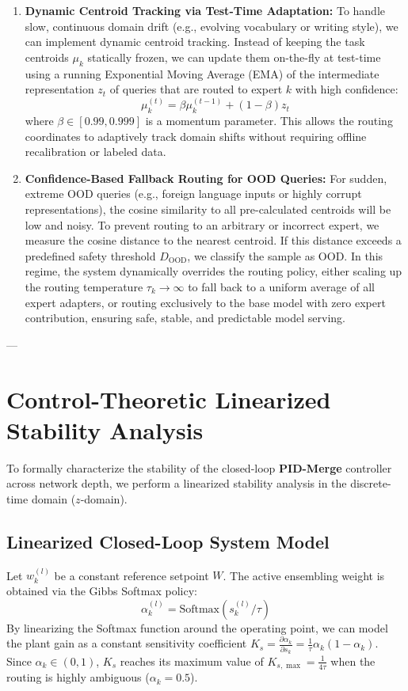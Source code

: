 \begin{enumerate}
    \item \textbf{Dynamic Centroid Tracking via Test-Time Adaptation:} To handle slow, continuous domain drift (e.g., evolving vocabulary or writing style), we can implement dynamic centroid tracking. Instead of keeping the task centroids $\mu_k$ statically frozen, we can update them on-the-fly at test-time using a running Exponential Moving Average (EMA) of the intermediate representation $z_t$ of queries that are routed to expert $k$ with high confidence:
    \begin{equation}
    \mu_k^{(t)} = \beta \mu_k^{(t-1)} + (1 - \beta) z_t
    \end{equation}
    where $\beta \in [0.99, 0.999]$ is a momentum parameter. This allows the routing coordinates to adaptively track domain shifts without requiring offline recalibration or labeled data.
    \item \textbf{Confidence-Based Fallback Routing for OOD Queries:} For sudden, extreme OOD queries (e.g., foreign language inputs or highly corrupt representations), the cosine similarity to all pre-calculated centroids will be low and noisy. To prevent routing to an arbitrary or incorrect expert, we measure the cosine distance to the nearest centroid. If this distance exceeds a predefined safety threshold $D_{\text{OOD}}$, we classify the sample as OOD. In this regime, the system dynamically overrides the routing policy, either scaling up the routing temperature $\tau_k \to \infty$ to fall back to a uniform average of all expert adapters, or routing exclusively to the base model with zero expert contribution, ensuring safe, stable, and predictable model serving.
\end{enumerate}

---

\section{Control-Theoretic Linearized Stability Analysis}
\label{sec:appendix_stability}

To formally characterize the stability of the closed-loop \textbf{PID-Merge} controller across network depth, we perform a linearized stability analysis in the discrete-time domain ($z$-domain).

\subsection{Linearized Closed-Loop System Model}
Let $w_k^{(l)}$ be a constant reference setpoint $W$. The active ensembling weight is obtained via the Gibbs Softmax policy:
\begin{equation}
\alpha_k^{(l)} = \text{Softmax}(s_k^{(l)} / \tau)
\end{equation}
By linearizing the Softmax function around the operating point, we can model the plant gain as a constant sensitivity coefficient $K_s = \frac{\partial \alpha_k}{\partial s_k} = \frac{1}{\tau} \alpha_k (1 - \alpha_k)$. Since $\alpha_k \in (0, 1)$, $K_s$ reaches its maximum value of $K_{s,\max} = \frac{1}{4\tau}$ when the routing is highly ambiguous ($\alpha_k = 0.5$).

